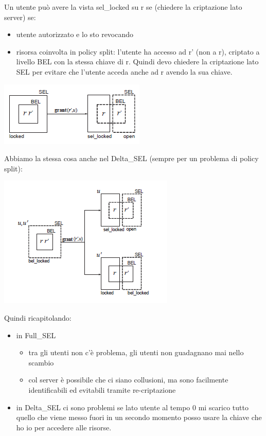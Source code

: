 Un utente può avere la vista sel\_locked su r se (chiedere la criptazione lato server) se:
\begin{itemize}
    \item utente autorizzato e lo sto revocando
    \item risorsa coinvolta in policy split: l'utente ha accesso ad r' (non a r), criptato a livello BEL con la stessa chiave di r. Quindi devo chiedere la criptazione lato SEL per evitare che l'utente acceda anche ad r avendo la sua chiave.
\end{itemize}
\begin{center}
    \includegraphics[scale=0.7]{img/seltrans.png}
\end{center}
Abbiamo la stessa cosa anche nel Delta\_SEL (sempre per un problema di policy split):
\begin{center}
    \includegraphics[scale=0.7]{img/deltatrans.png}
\end{center}
Quindi ricapitolando:
\begin{itemize}
    \item in Full\_SEL
    \begin{itemize}
        \item tra gli utenti non c'è problema, gli utenti non guadagnano mai nello scambio
        \item col server è possibile che ci siano collusioni, ma sono facilmente identificabili ed evitabili tramite re-criptazione
    \end{itemize}
    \item in Delta\_SEL ci sono problemi se lato utente al tempo 0 mi scarico tutto quello che viene messo fuori in un secondo momento posso usare la chiave che ho io per accedere alle risorse.
\end{itemize}

